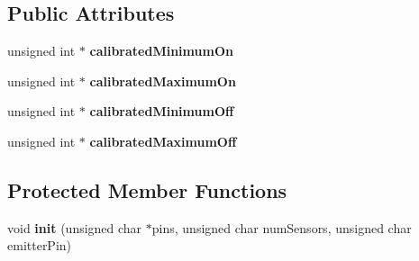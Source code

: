 \subsection*{Public Attributes}
\begin{DoxyCompactItemize}
\item 
\mbox{\label{class_q_t_r_sensors_a9308c21df0015965dceb9dd1f570f78d}} 
unsigned int $\ast$ {\bfseries calibrated\+Minimum\+On}
\item 
\mbox{\label{class_q_t_r_sensors_ab7a739d5bb85b17e94e825454cc63195}} 
unsigned int $\ast$ {\bfseries calibrated\+Maximum\+On}
\item 
\mbox{\label{class_q_t_r_sensors_af299d7e4a7900f4f3d5e567a10f4ab16}} 
unsigned int $\ast$ {\bfseries calibrated\+Minimum\+Off}
\item 
\mbox{\label{class_q_t_r_sensors_a75af08628235c3ec5d4414a6032a016c}} 
unsigned int $\ast$ {\bfseries calibrated\+Maximum\+Off}
\end{DoxyCompactItemize}
\subsection*{Protected Member Functions}
\begin{DoxyCompactItemize}
\item 
\mbox{\label{class_q_t_r_sensors_ae1d5eb9479d4dee1977109b17aece70e}} 
void {\bfseries init} (unsigned char $\ast$pins, unsigned char num\+Sensors, unsigned char emitter\+Pin)
\end{DoxyCompactItemize}
